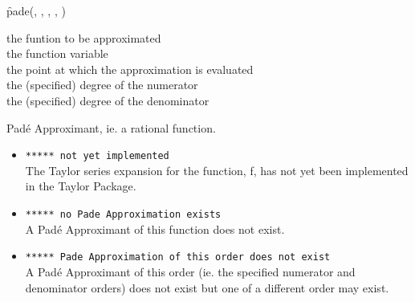 \hypertarget{operator:PADE}{}
\begin{description}[labelwidth=!,leftmargin=20mm]
\item[\textbf{SYNTAX:}]
  \begin{syntax}
    \f{pade(, , , , )}
  \end{syntax}

\item[\textbf{INPUT:}]
 \hspace{6mm} the funtion to be approximated\\
 \hspace{6mm} the function variable\\
 \hspace{6mm} the point at which the approximation is evaluated\\
 \hspace{6mm} the (specified) degree of the numerator\\
 \hspace{6mm} the (specified) degree of the denominator

\item[\textbf{RESULT:}]
Pad\'{e} Approximant, ie. a rational function.

\item[\textbf{ERROR MESSAGES:}]\hspace*{8cm}
  
  \begin{itemize}[left=-15mm,label={}]

\item
  \texttt{***** not yet implemented}\\
  The Taylor series expansion for the function, f, has not yet
  been implemented in the {\REDUCE} Taylor Package.

\item
  \texttt{***** no Pade Approximation exists}\\
  A Pad\'{e} Approximant of this function does not exist.

\item
  \texttt{***** Pade Approximation of this order does not exist}\\
  A Pad\'{e} Approximant of this order (ie. the specified
  numerator and denominator orders) does not exist but one
  of a different order may exist.
  \end{itemize}
  
\end{description}

